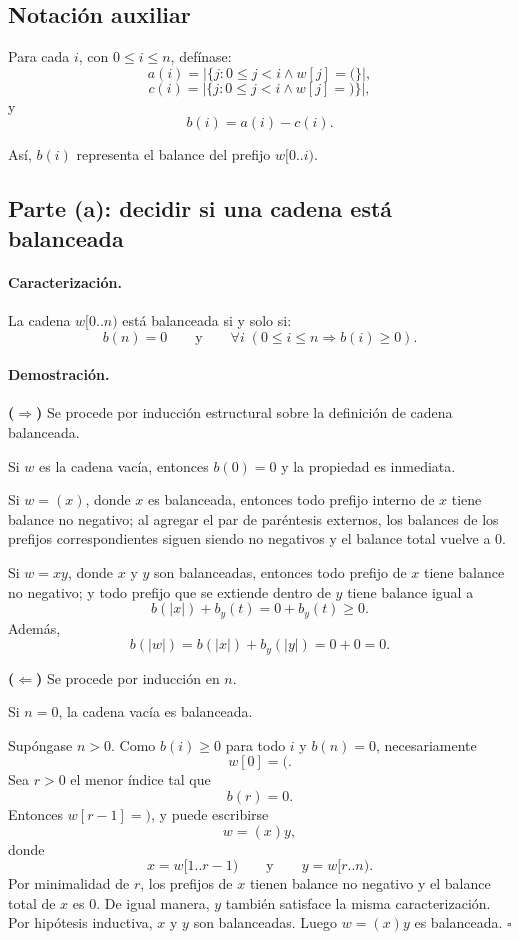 \documentclass[11pt]{article}
\begin{document}
\subsection*{Notación auxiliar}

Para cada \(i\), con \(0\leq i\leq n\), defínase:
\[
a(i)=\big|\{j:0\leq j<i \land w[j]=\texttt{(}\}\big|,
\]
\[
c(i)=\big|\{j:0\leq j<i \land w[j]=\texttt{)}\}\big|,
\]
y
\[
b(i)=a(i)-c(i).
\]

Así, \(b(i)\) representa el balance del prefijo \(w[0..i)\).

\subsection*{Parte (a): decidir si una cadena está balanceada}

\paragraph{Caracterización.}
La cadena \(w[0..n)\) está balanceada si y solo si:
\[
b(n)=0
\qquad\text{y}\qquad
\forall i\; (0\leq i\leq n \Rightarrow b(i)\geq 0).
\]

\paragraph{Demostración.}
\textbf{(\(\Rightarrow\))} Se procede por inducción estructural sobre la definición de cadena
balanceada.

Si \(w\) es la cadena vacía, entonces \(b(0)=0\) y la propiedad es inmediata.

Si \(w=(x)\), donde \(x\) es balanceada, entonces todo prefijo interno de \(x\) tiene balance
no negativo; al agregar el par de paréntesis externos, los balances de los prefijos
correspondientes siguen siendo no negativos y el balance total vuelve a \(0\).

Si \(w=xy\), donde \(x\) y \(y\) son balanceadas, entonces todo prefijo de \(x\) tiene balance
no negativo; y todo prefijo que se extiende dentro de \(y\) tiene balance igual a
\[
b(|x|)+b_y(t)=0+b_y(t)\geq 0.
\]
Además,
\[
b(|w|)=b(|x|)+b_y(|y|)=0+0=0.
\]

\textbf{(\(\Leftarrow\))} Se procede por inducción en \(n\).

Si \(n=0\), la cadena vacía es balanceada.

Supóngase \(n>0\). Como \(b(i)\geq 0\) para todo \(i\) y \(b(n)=0\), necesariamente
\[
w[0]=\texttt{(}.
\]
Sea \(r>0\) el menor índice tal que
\[
b(r)=0.
\]
Entonces \(w[r-1]=\texttt{)}\), y puede escribirse
\[
w=(x)y,
\]
donde
\[
x=w[1..r-1)
\qquad\text{y}\qquad
y=w[r..n).
\]
Por minimalidad de \(r\), los prefijos de \(x\) tienen balance no negativo y el balance
total de \(x\) es \(0\). De igual manera, \(y\) también satisface la misma caracterización.
Por hipótesis inductiva, \(x\) y \(y\) son balanceadas. Luego \(w=(x)y\) es balanceada.
\(\square\)
\end{document}
